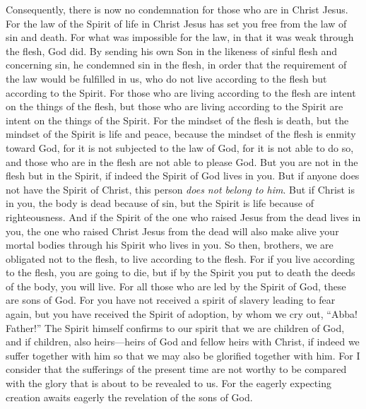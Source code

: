 \begin{biblechapter} %
 Consequently, there is now no condemnation for those who are in Christ Jesus.
\verse For the law of the Spirit of life in Christ Jesus has set you free from the law of sin and death.
\verse For what was impossible for the law, in that it was weak through the flesh, God did. By sending his own Son in the likeness of sinful flesh and concerning sin, he condemned sin in the flesh,
\verse in order that the requirement of the law would be fulfilled in us, who do not live according to the flesh but according to the Spirit.
\verse For those who are living according to the flesh are intent on the things of the flesh, but those who are living according to the Spirit are intent on the things of the Spirit.
\verse For the mindset of the flesh is death, but the mindset of the Spirit is life and peace,
\verse because the mindset of the flesh is enmity toward God, for it is not subjected to the law of God, for it is not able to do so,
\verse and those who are in the flesh are not able to please God.
\verse But you are not in the flesh but in the Spirit, if indeed the Spirit of God lives in you. But if anyone does not have the Spirit of Christ, this person \textit{does not belong to him}.
\verse But if Christ is in you, the body is dead because of sin, but the Spirit is life because of righteousness.
\verse And if the Spirit of the one who raised Jesus from the dead lives in you, the one who raised Christ Jesus from the dead will also make alive your mortal bodies through his Spirit who lives in you.
\verse So then, brothers, we are obligated not to the flesh, to live according to the flesh.
\verse For if you live according to the flesh, you are going to die, but if by the Spirit you put to death the deeds of the body, you will live.
\verse For all those who are led by the Spirit of God, these are sons of God.
\verse For you have not received a spirit of slavery leading to fear again, but you have received the Spirit of adoption, by whom we cry out, “Abba! Father!”
\verse The Spirit himself confirms to our spirit that we are children of God,
\verse and if children, also heirs—heirs of God and fellow heirs with Christ, if indeed we suffer together with him so that we may also be glorified together with him.
 For I consider that the sufferings of the present time are not worthy to be compared with the glory that is about to be revealed to us.
\verse For the eagerly expecting creation awaits eagerly the revelation of the sons of God.

\end{biblechapter}
